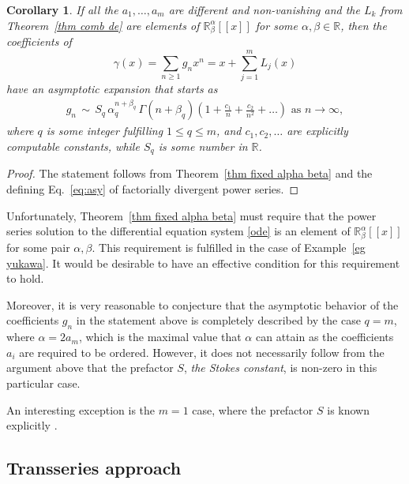 \documentclass[oneside]{amsart}
\newtheorem{cor}[thm]{Corollary}
\theoremstyle{definition}
\newcommand{\R}{{\mathbb{R}}}
\begin{document}
\begin{cor}
\label{cor:asymp}
If all the $a_1,\ldots,a_m$ are different and non-vanishing and 
the $L_k$ from Theorem~\ref{thm comb de} are elements of $\R^\alpha_\beta[[x]]$ for some $\alpha,\beta\in \R$,
then the coefficients of 
$$\gamma(x)= \sum_{n \geq 1} g_n x^n = x + \sum_{j=1}^m L_j(x)$$
 have an asymptotic expansion that starts as
\begin{align*} g_n \,\sim\, S_q\, \alpha_q^{n+\beta_q}\, \Gamma(n+\beta_q)\left( 1+ \frac{c_1}{n} + \frac{c_2}{n^2} + \ldots\right) \text{ as } n \rightarrow \infty, \end{align*}
where $q$ is some integer fulfilling $1\leq q \leq m$, and 
$c_1,c_2,\ldots$ are explicitly computable constants,
while $S_q$ is some number in $\R$. 
\end{cor}
\begin{proof}
The statement follows from Theorem~\ref{thm fixed alpha beta} and the defining Eq.~\eqref{eq:asy} of factorially divergent power series.
\end{proof}

Unfortunately, Theorem~\ref{thm fixed alpha beta} must require that the power series solution to the differential equation system \eqref{ode} is an element of $\R^\alpha_\beta[[x]]$ for some pair $\alpha,\beta$.
This requirement is fulfilled in the case of Example~\ref{eg yukawa}.
It would be desirable to have an effective condition for this requirement to hold.

Moreover, it is very reasonable to conjecture that the asymptotic behavior of the coefficients $g_n$ in
the statement above is completely described by the case $q=m$, where $\alpha=2a_m$, which is the 
maximal value that $\alpha$ can attain as the coefficients $a_i$ are required to be ordered. However, it does not necessarily follow from the argument above 
that the prefactor $S$, \emph{the Stokes constant}, is non-zero in this particular case.

An interesting exception is the $m=1$ case, where the prefactor $S$ is known explicitly \cite[\S 7.1]{Bgenfun}.

\subsection{Transseries approach}
\label{sec trans}

%
\end{document}
